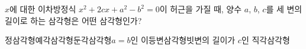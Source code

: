 $x$에 대한 이차방정식 $x^2+2cx+a^2-b^2=0$이 허근을 가질 때, 양수 $a$, $b$, $c$를 세 변의 길이로 하는 삼각형은 어떤 삼각형인가?
\begin{choicesii}{정삼각형}{예각삼각형}{둔각삼각형}{$a=b$인 이등변삼각형}{빗변의 길이가 $c$인 직각삼각형}\end{choicesii}
